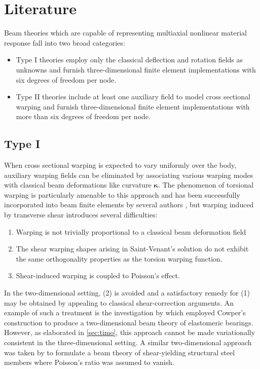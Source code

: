 \section{Literature}

Beam theories which are capable of representing multiaxial nonlinear material response fall into two broad categories:
\begin{itemize}
    \item Type I theories employ only the classical deflection and rotation fields as unknowns and furnish three-dimensional finite element implementations with six degrees of freedom per node.
    \item Type II theories include at least one auxiliary field to model cross sectional warping and furnish three-dimensional finite element implementations with more than six degrees of freedom per node.
\end{itemize}


\subsection{Type I}
When cross sectional warping is expected to vary uniformly over the body, auxiliary warping fields can be eliminated by associating various warping modes with classical beam deformations like curvature \(\bm{\kappa}\). 
The phenomenon of torsional warping is particularly amenable to this approach and has been successfully incorporated into beam finite elements by several authors %
, but warping induced by transverse shear introduces several difficulties:
\begin{enumerate}
    \item Warping is not trivially proportional to a classical beam deformation field
    \item The shear warping shapes arising in Saint-Venant's solution do not exhibit the same orthogonality properties as the torsion warping function.
    \item Shear-induced warping is coupled to Poisson's effect.
\end{enumerate}
In the two-dimensional setting, (2) is avoided and a satisfactory remedy for (1) may be obtained by appealing to classical shear-correction arguments.
An example of such a treatment is the investigation by \cite{simo1982bifurcation} which employed Cowper's construction \citep{cowper1966shear} to produce a two-dimensional beam theory of elastomeric bearings. 
However, as elaborated in \cref{sec:timo}, this approach cannot be made variationally consistent in the three-dimensional setting. 
A similar two-dimensional approach was taken by \cite{saritas2006mixed} to formulate a beam theory of shear-yielding structural steel members where Poisson's ratio was assumed to vanish.

